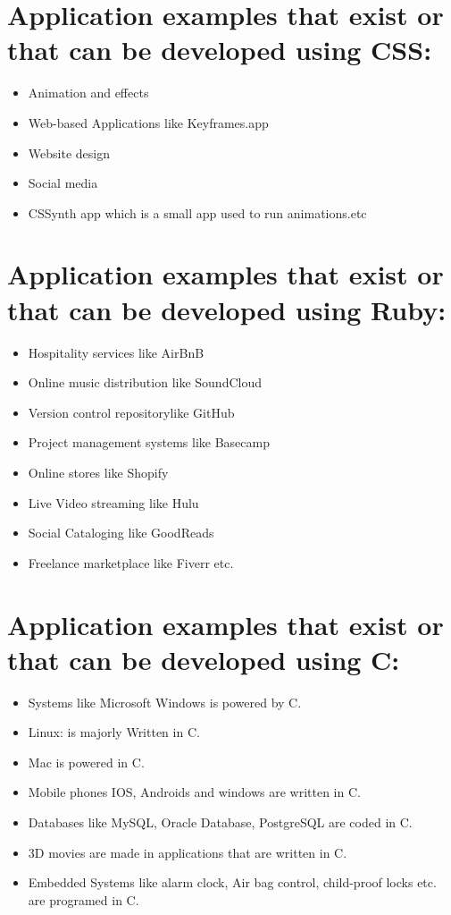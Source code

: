 \documentclass{article}
\begin{document}
 \section*{Application examples that exist or that can be developed using CSS:}
   	   	\begin{itemize}
   	   		\item Animation and effects
   	   		\item Web-based Applications like Keyframes.app 
   	   		\item Website design
   	   		\item Social media  
   	   		\item CSSynth app which is a small app used to run animations.etc
   	   	\end{itemize}
    \section*{Application examples that exist or that can be developed using Ruby:}
   	  	\begin{itemize}
   	  		\item Hospitality services like AirBnB
   	  		\item Online music distribution like SoundCloud
   	  		\item Version control repositorylike GitHub
   	  		\item Project management systems like Basecamp
   	  		\item Online stores like Shopify
   	  		\item Live Video streaming like Hulu
   	  		\item Social Cataloging like GoodReads
   	  		\item Freelance marketplace like Fiverr etc.
        \end{itemize}	
    \section*{Application examples that exist or that can be developed using C:}
    \begin{itemize}
    	\item Systems like Microsoft Windows is powered by C.
    	\item Linux: is majorly Written in C.
    	\item Mac is powered in C.
    	\item Mobile phones IOS, Androids and windows are written in C. 
    	\item Databases like MySQL, Oracle Database, PostgreSQL are coded in C.
    	\item 3D movies are made in applications that are written in C.
    	\item Embedded Systems like alarm clock, Air bag control, child-proof locks etc. are programed in C.
    \end{itemize}
\end{document}
